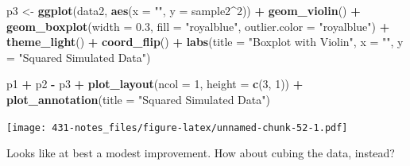 \documentclass[
]{book}
\newenvironment{Shaded}{\begin{snugshade}}{\end{snugshade}}
\newcommand{\DataTypeTok}[1]{\textcolor[rgb]{0.13,0.29,0.53}{#1}}
\newcommand{\DecValTok}[1]{\textcolor[rgb]{0.00,0.00,0.81}{#1}}
\newcommand{\FloatTok}[1]{\textcolor[rgb]{0.00,0.00,0.81}{#1}}
\newcommand{\KeywordTok}[1]{\textcolor[rgb]{0.13,0.29,0.53}{\textbf{#1}}}
\newcommand{\NormalTok}[1]{#1}
\newcommand{\OperatorTok}[1]{\textcolor[rgb]{0.81,0.36,0.00}{\textbf{#1}}}
\newcommand{\StringTok}[1]{\textcolor[rgb]{0.31,0.60,0.02}{#1}}
\begin{document}
\begin{Shaded}
\begin{Highlighting}[]
\NormalTok{p3 <-}\StringTok{ }\KeywordTok{ggplot}\NormalTok{(data2, }\KeywordTok{aes}\NormalTok{(}\DataTypeTok{x =} \StringTok{""}\NormalTok{, }\DataTypeTok{y =}\NormalTok{ sample2}\OperatorTok{^}\DecValTok{2}\NormalTok{)) }\OperatorTok{+}
\StringTok{    }\KeywordTok{geom_violin}\NormalTok{() }\OperatorTok{+}
\StringTok{    }\KeywordTok{geom_boxplot}\NormalTok{(}\DataTypeTok{width =} \FloatTok{0.3}\NormalTok{, }\DataTypeTok{fill =} \StringTok{"royalblue"}\NormalTok{, }
                 \DataTypeTok{outlier.color =} \StringTok{"royalblue"}\NormalTok{) }\OperatorTok{+}
\StringTok{    }\KeywordTok{theme_light}\NormalTok{() }\OperatorTok{+}
\StringTok{    }\KeywordTok{coord_flip}\NormalTok{() }\OperatorTok{+}
\StringTok{    }\KeywordTok{labs}\NormalTok{(}\DataTypeTok{title =} \StringTok{"Boxplot with Violin"}\NormalTok{,}
         \DataTypeTok{x =} \StringTok{""}\NormalTok{, }\DataTypeTok{y =} \StringTok{"Squared Simulated Data"}\NormalTok{)}

\NormalTok{p1 }\OperatorTok{+}\StringTok{ }\NormalTok{p2 }\OperatorTok{-}\StringTok{ }\NormalTok{p3 }\OperatorTok{+}\StringTok{ }\KeywordTok{plot_layout}\NormalTok{(}\DataTypeTok{ncol =} \DecValTok{1}\NormalTok{, }\DataTypeTok{height =} \KeywordTok{c}\NormalTok{(}\DecValTok{3}\NormalTok{, }\DecValTok{1}\NormalTok{)) }\OperatorTok{+}
\StringTok{    }\KeywordTok{plot_annotation}\NormalTok{(}\DataTypeTok{title =} \StringTok{"Squared Simulated Data"}\NormalTok{)}
\end{Highlighting}
\end{Shaded}

\texttt{[image: 431-notes\_files/figure-latex/unnamed-chunk-52-1.pdf]}

Looks like at best a modest improvement. How about cubing the data, instead?
\end{document}

